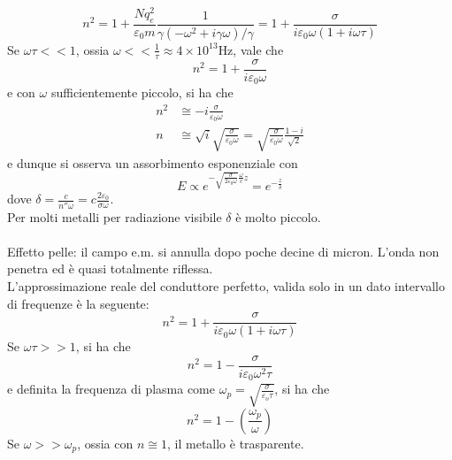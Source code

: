 \documentclass{article}
\begin{document}
\begin{equation}
    n^2=1+\frac{Nq_e^2}{\varepsilon_0m}\frac{1}{\gamma(-\omega^2+i\gamma\omega)/\gamma}=1+\frac{\sigma}{i\varepsilon_0\omega(1+i\omega\tau)}
    \nonumber
\end{equation}
Se $\omega\tau<<1$, ossia $\omega<<\frac{1}{\tau}\approx 4\times 10^{13}\text{Hz}$, vale che
\begin{equation}
    n^2=1+\frac{\sigma}{i\varepsilon_0\omega}
    \nonumber
\end{equation}
e con $\omega$ sufficientemente piccolo, si ha che
\begin{equation}
\begin{split}
    n^2&\cong-i\frac{\sigma}{\varepsilon_0\omega}\\
    n&\cong\sqrt{i}\sqrt{\frac{\sigma}{\varepsilon_0\omega}}=\sqrt{\frac{\sigma}{\varepsilon_0\omega}}\frac{1-i}{\sqrt{2}}
    \nonumber
\end{split}
\end{equation}
e dunque si osserva un assorbimento esponenziale con
\begin{equation}
    E\propto e^{-\sqrt{\frac{\sigma}{2\varepsilon_0\omega}}\frac{\omega}{c}z}=e^{-\frac{z}{\delta}}
    \nonumber
\end{equation}
dove $\delta=\frac{c}{n''\omega}=c\frac{2\varepsilon_0}{\sigma\omega}$.\\
Per molti metalli per radiazione visibile $\delta$ è molto piccolo.\\
\\
Effetto pelle: il campo e.m. si annulla dopo poche decine di micron. L’onda non penetra ed è quasi totalmente riflessa.\\
L'approssimazione reale del conduttore perfetto, valida solo in un dato intervallo di frequenze è la seguente:
\begin{equation}
    n^2=1+\frac{\sigma}{i\varepsilon_0\omega(1+i\omega\tau)}
    \nonumber
\end{equation}
Se $\omega\tau>>1$, si ha che
\begin{equation}
    n^2=1-\frac{\sigma}{i\varepsilon_0\omega^2\tau}
    \nonumber
\end{equation}
e definita la frequenza di plasma come $\omega_p=\sqrt{\frac{\sigma}{\varepsilon_o\tau}}$, si ha che
\begin{equation}
    n^2=1-\left(\frac{\omega_p}{\omega}\right)
    \nonumber
\end{equation}
Se $\omega>>\omega_p$, ossia con $n\cong 1$, il metallo è trasparente.\\
\end{document}
